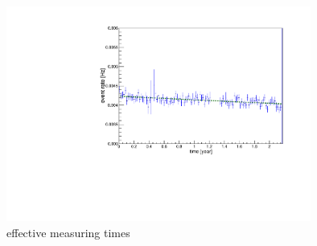 \documentclass[encoding=utf8,british]{tumphthesis}
\begin{document}
\begin{figure}[t!]
	\centering
	\ifmakefigures%
	\includegraphics[width=100mm]{./Bilder/eventRateFit.pdf}
	\fi%
	\caption{effective measuring times}
	\label{fig:ChangeInEventRateFit}
\end{figure}%
\end{document}
